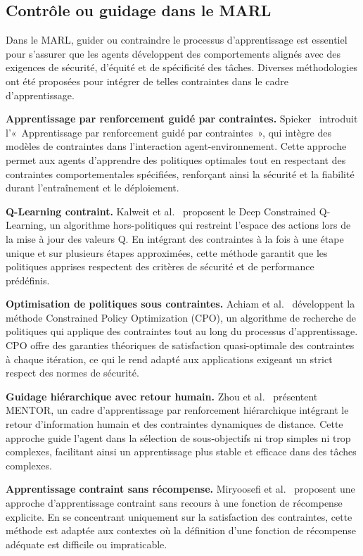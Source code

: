 \documentclass[pdflatex,sn-mathphys-num]{sn-jnl}%
\theoremstyle{thmstyleone}%
\theoremstyle{thmstyletwo}%
\theoremstyle{thmstylethree}%
\begin{document}
\subsection{Contrôle ou guidage dans le MARL}\label{sub-sec:rel_control}

Dans le MARL, guider ou contraindre le processus d'apprentissage est essentiel pour s'assurer que les agents développent des comportements alignés avec des exigences de sécurité, d'équité et de spécificité des tâches. Diverses méthodologies ont été proposées pour intégrer de telles contraintes dans le cadre d'apprentissage.

\textbf{Apprentissage par renforcement guidé par contraintes.} Spieker~\cite{spieker2021constraint} introduit l'« Apprentissage par renforcement guidé par contraintes », qui intègre des modèles de contraintes dans l'interaction agent-environnement. Cette approche permet aux agents d'apprendre des politiques optimales tout en respectant des contraintes comportementales spécifiées, renforçant ainsi la sécurité et la fiabilité durant l'entraînement et le déploiement.

\textbf{Q-Learning contraint.} Kalweit et al.~\cite{kalweit2020deep} proposent le Deep Constrained Q-Learning, un algorithme hors-politiques qui restreint l'espace des actions lors de la mise à jour des valeurs Q. En intégrant des contraintes à la fois à une étape unique et sur plusieurs étapes approximées, cette méthode garantit que les politiques apprises respectent des critères de sécurité et de performance prédéfinis.

\textbf{Optimisation de politiques sous contraintes.} Achiam et al.~\cite{achiam2017constrained} développent la méthode Constrained Policy Optimization (CPO), un algorithme de recherche de politiques qui applique des contraintes tout au long du processus d'apprentissage. CPO offre des garanties théoriques de satisfaction quasi-optimale des contraintes à chaque itération, ce qui le rend adapté aux applications exigeant un strict respect des normes de sécurité.

\textbf{Guidage hiérarchique avec retour humain.} Zhou et al.~\cite{zhou2024mentor} présentent MENTOR, un cadre d'apprentissage par renforcement hiérarchique intégrant le retour d'information humain et des contraintes dynamiques de distance. Cette approche guide l'agent dans la sélection de sous-objectifs ni trop simples ni trop complexes, facilitant ainsi un apprentissage plus stable et efficace dans des tâches complexes.

\textbf{Apprentissage contraint sans récompense.} Miryoosefi et al.~\cite{miryoosefi2022simple} proposent une approche d'apprentissage contraint sans recours à une fonction de récompense explicite. En se concentrant uniquement sur la satisfaction des contraintes, cette méthode est adaptée aux contextes où la définition d'une fonction de récompense adéquate est difficile ou impraticable.
\end{document}
